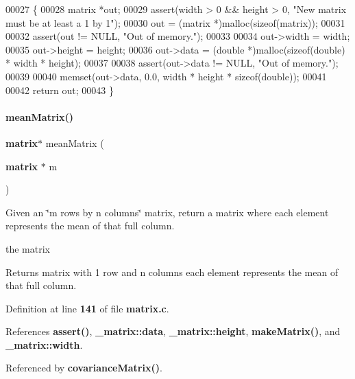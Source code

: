\begin{DoxyCode}
00027                                           \{
00028   matrix *out;
00029   assert(width > 0 && height > 0, \textcolor{stringliteral}{"New matrix must be at least a 1 by 1"});
00030   out = (matrix *)malloc(\textcolor{keyword}{sizeof}(matrix));
00031 
00032   assert(out != NULL, \textcolor{stringliteral}{"Out of memory."});
00033 
00034   out->width = width;
00035   out->height = height;
00036   out->data = (\textcolor{keywordtype}{double} *)malloc(\textcolor{keyword}{sizeof}(\textcolor{keywordtype}{double}) * width * height);
00037 
00038   assert(out->data != NULL, \textcolor{stringliteral}{"Out of memory."});
00039 
00040   memset(out->data, 0.0, width * height * \textcolor{keyword}{sizeof}(\textcolor{keywordtype}{double}));
00041 
00042   \textcolor{keywordflow}{return} out;
00043 \}
\end{DoxyCode}
\mbox{\label{a00125_ae4babf9b518a2d5d6b12776191e3b7de}} 
\paragraph{mean\+Matrix()}
{\footnotesize\ttfamily \textbf{ matrix}$\ast$ mean\+Matrix (\begin{DoxyParamCaption}\item[{\textbf{ matrix} $\ast$}]{m }\end{DoxyParamCaption})}



Given an \char`\"{}m rows by n columns\char`\"{} matrix, return a matrix where each element represents the mean of that full column. 

the matrix \begin{DoxyReturn}{Returns}
matrix with 1 row and n columns each element represents the mean of that full column. 
\end{DoxyReturn}


Definition at line \textbf{ 141} of file \textbf{ matrix.\+c}.



References \textbf{ assert()}, \textbf{ \+\_\+matrix\+::data}, \textbf{ \+\_\+matrix\+::height}, \textbf{ make\+Matrix()}, and \textbf{ \+\_\+matrix\+::width}.



Referenced by \textbf{ covariance\+Matrix()}.



